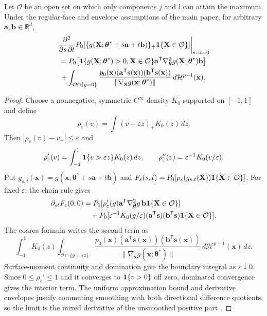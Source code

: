 \begin{lemma}
\label{lem:s-positive-part}
Let $\mathcal O$ be an open set on which only components $j$ and $l$ can
attain the maximum.  Under the regular-face and envelope assumptions of the
main paper, for arbitrary $\mathbf{a},\mathbf{b}\in\mathbb R^d$,
\begin{multline}
 \left.
 \frac{\partial^2}{\partial s\,\partial t}
 P_0\!\left[
 \{g(\mathbf{X};\boldsymbol{\theta}^*
       +s\mathbf{a}+t\mathbf{b})\}_+
 \mathbf 1\{\mathbf{X}\in\mathcal O\}
 \right]
 \right|_{s=t=0}\\
 =P_0\!\left[
 \mathbf 1\{g(\mathbf{X};\boldsymbol{\theta}^*)>0,
          \mathbf{X}\in\mathcal O\}
 \mathbf{a}^\mathsf T
 \nabla_{\boldsymbol{\theta}}^2g
 (\mathbf{X};\boldsymbol{\theta}^*)\mathbf{b}
 \right]\\
 +\int_{\mathcal O\cap\{g=0\}}
 \frac{p_0(\mathbf{x})
 (\mathbf{a}^\mathsf T\mathbf{s}(\mathbf{x}))
 (\mathbf{b}^\mathsf T\mathbf{s}(\mathbf{x}))}
 {\|\nabla_{\mathbf{x}}g
       (\mathbf{x};\boldsymbol{\theta}^*)\|}
 \,d\mathcal H^{p-1}(\mathbf{x}).
 \label{eq:s-positive-part}
\end{multline}
\end{lemma}

\begin{proof}
Choose a nonnegative, symmetric $C^\infty$ density $K_0$ supported on
$[-1,1]$ and define
\[
 \rho_\varepsilon(v)
 =\int (v-\varepsilon z)_+K_0(z)\,dz.
\]
Then $|\rho_\varepsilon(v)-v_+|\leq\varepsilon$ and
\[
 \rho_\varepsilon'(v)=\int_{-1}^1\mathbf 1\{v>\varepsilon z\}K_0(z)\,dz,
 \qquad \rho_\varepsilon''(v)=\varepsilon^{-1}K_0(v/\varepsilon).
\]
Put $g_{s,t}(\mathbf x)=g(\mathbf x;\boldsymbol\theta^*+s\mathbf a+t\mathbf b)$
and $F_\varepsilon(s,t)=P_0[\rho_\varepsilon(g_{s,t}(\mathbf X))
\mathbf 1\{\mathbf X\in\mathcal O\}]$. For fixed $\varepsilon$, the chain rule gives
\begin{align*}
 \partial_{st}F_\varepsilon(0,0)
 &=P_0[\rho_\varepsilon'(g)\mathbf a^\mathsf T
 \nabla_{\boldsymbol\theta}^2g\,\mathbf b\mathbf 1\{\mathbf X\in\mathcal O\}]\\
 &\quad+P_0[\varepsilon^{-1}K_0(g/\varepsilon)
 (\mathbf a^\mathsf T\mathbf s)(\mathbf b^\mathsf T\mathbf s)
 \mathbf 1\{\mathbf X\in\mathcal O\}].
\end{align*}
The coarea formula writes the second term as
\[
 \int_{-1}^1K_0(z)\int_{\mathcal O\cap\{g=\varepsilon z\}}
 \frac{p_0(\mathbf x)(\mathbf a^\mathsf T\mathbf s(\mathbf x))
 (\mathbf b^\mathsf T\mathbf s(\mathbf x))}
 {\|\nabla_{\mathbf x}g(\mathbf x;\boldsymbol\theta^*)\|}
 \,d\mathcal H^{p-1}(\mathbf x)\,dz.
\]
Surface-moment continuity and domination give the boundary integral as
$\varepsilon\downarrow0$. Since $0\leq\rho_\varepsilon'\leq1$ and it converges
to $\mathbf 1\{v>0\}$ off zero, dominated convergence gives the interior term.
The uniform approximation bound and derivative envelopes justify commuting
smoothing with both directional difference quotients, so the limit is the
mixed derivative of the unsmoothed positive part \citep{evans2015measure}.
\end{proof}

